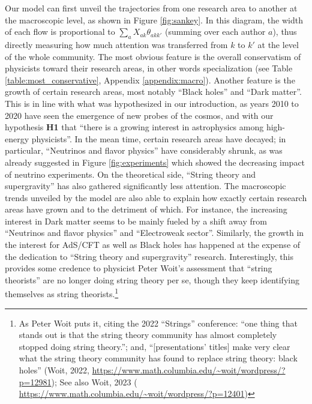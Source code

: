 \documentclass{article}
\begin{document}
Our model can first unveil the trajectories from one research area to another at the macroscopic level, as shown in Figure \ref{fig:sankey}. In this diagram, the width of each flow is proportional to $\sum_a X_{ak}\theta_{akk'}$ (summing over each author $a$), thus directly measuring how much attention was transferred from $k$ to $k'$ at the level of the whole community. The most obvious feature is the overall conservatism of physicists toward their research areas, in other words specialization (see Table \ref{table:most_conservative}, Appendix \ref{appendix:macro}). Another feature is the growth of certain research areas, most notably ``Black holes'' and ``Dark matter''. This is in line with what was hypothesized in our introduction, as years 2010 to 2020 have seen the emergence of new probes of the cosmos, and with our hypothesis \textbf{H1} that ``there is a growing interest in astrophysics among high-energy physicists''. In the mean time, certain research areas have decayed; in particular, ``Neutrinos and flavor physics'' have considerably shrunk, as was already suggested in Figure \ref{fig:experiments} which showed the decreasing impact of neutrino experiments. On the theoretical side, ``String theory and supergravity'' has also gathered significantly less attention. The macroscopic trends unveiled by the model are also able to explain how exactly certain research areas have grown and to the detriment of which. For instance, the increasing interest in Dark matter seems to be mainly fueled by a shift away from ``Neutrinos and flavor physics'' and ``Electroweak sector''. Similarly, the growth in the interest for AdS/CFT as well as Black holes has happened at the expense of the dedication to ``String theory and supergravity'' research. Interestingly, this provides some credence to physicist Peter Woit's assessment that ``string theorists'' are no longer doing string theory per se, though they keep identifying themselves as string theorists.\footnote{As Peter Woit puts it, citing the 2022 ``Strings'' conference: ``one thing that stands out is that the string theory community has almost completely stopped doing string theory.''; and, ``[presentations' titles] make very clear what the string theory community has found to replace string theory: black holes'' (Woit, 2022, \url{https://www.math.columbia.edu/~woit/wordpress/?p=12981}); See also Woit, 2023 ( \url{https://www.math.columbia.edu/~woit/wordpress/?p=12401})} 
\end{document}
